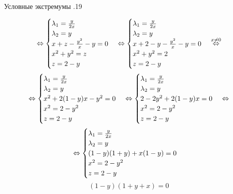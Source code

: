 \documentclass[12pt, fleqn]{article}
\begin{document}
\begin{lect} {Условные экстремумы .19}
\begin{Task}[3]
            \[\Leftrightarrow \begin{cases}
                \lambda_1 = \frac{y}{2x}\\
                \lambda_2 = y\\
                x + z - \frac{y^2}{x} - y = 0\\
                x^2 + y^2 = z\\
                z = 2 - y
            \end{cases} \Leftrightarrow \begin{cases}
                \lambda_1 = \frac{y}{2x}\\
                \lambda_2 = y\\
                x + 2 - y - \frac{y^2}{x} - y = 0\\
                x^2 + y^2 = 2\\
                z = 2 - y
            \end{cases} \overset{x \neq 0}{ \Leftrightarrow}\]
            \[\Leftrightarrow \begin{cases}
                \lambda_1 = \frac{y}{2x}\\
                \lambda_2 = y\\
                x^2 + 2(1 - y)x - y^2 = 0\\
                x^2 = 2 - y^2\\
                z = 2 - y
            \end{cases} \Leftrightarrow \begin{cases}
                \lambda_1 = \frac{y}{2x}\\
                \lambda_2 = y\\
                2 - 2y^2 + 2(1 - y)x = 0\\
                x^2 = 2 - y^2\\
                z = 2 - y
            \end{cases} \Leftrightarrow\]
            \[\Leftrightarrow \begin{cases}
                \lambda_1 = \frac{y}{2x}\\
                \lambda_2 = y\\
                (1 - y)(1 + y) + x(1 - y) = 0\\
                x^2 = 2 - y^2\\
                z = 2 - y
            \end{cases}\]
            \[(1 - y)(1 + y + x) = 0\]


\end{Task}
\end{lect}
\end{document}
